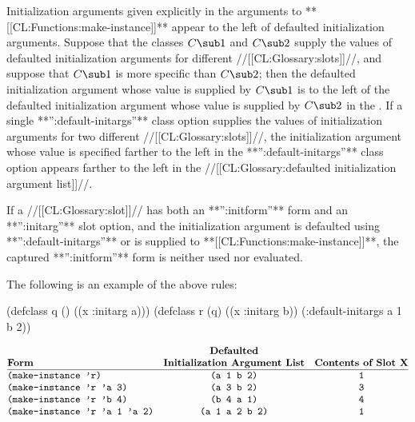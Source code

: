 Initialization arguments given explicitly in the arguments to
**[[CL:Functions:make-instance]]** appear to the left of defaulted initialization
arguments. Suppose that the classes $C\sub 1$ and $C\sub 2$ supply the
values of defaulted initialization arguments for different //[[CL:Glossary:slots]]//,
and suppose that $C\sub 1$ is more specific than $C\sub 2$; then the
defaulted initialization argument whose value is supplied by $C\sub 1$
is to the left of the defaulted initialization argument whose value is
supplied by $C\sub 2$ in the .  If a single **'':default-initargs''** class option supplies the
values of initialization arguments for two different //[[CL:Glossary:slots]]//, the
initialization argument whose value is specified farther to the left in
the **'':default-initargs''** class option appears farther to the left in
the //[[CL:Glossary:defaulted initialization argument list]]//.

                                                        
If a //[[CL:Glossary:slot]]// has both an **'':initform''** form and an 
**'':initarg''** slot option, and the initialization argument is defaulted
using **'':default-initargs''** or is supplied to **[[CL:Functions:make-instance]]**,
the captured **'':initform''** form is neither used nor evaluated.

The following is an example of the above rules:

\code
 (defclass q () ((x :initarg a)))
 (defclass r (q) ((x :initarg b))
   (:default-initargs a 1 b 2))
\endcode

$$\vbox{\halign{\strut#\hfil&\quad\hfil#\hfil&\quad\hfil#\hfil\cr
{}&\bf Defaulted&{}\cr
\bf Form&\bf Initialization Argument List&\bf Contents of Slot X\cr
\noalign{\hrule}
{\tt (make-instance 'r)}&{\tt (a 1 b 2)}&{\tt 1}\cr
{\tt (make-instance 'r 'a 3)}&{\tt (a 3 b 2)}&{\tt 3}\cr
{\tt (make-instance 'r 'b 4)}&{\tt (b 4 a 1)}&{\tt 4}\cr
{\tt (make-instance 'r 'a 1 'a 2)}&{\tt (a 1 a 2 b 2)}&{\tt 1}\cr}}$$

\endsubsection%

                      
